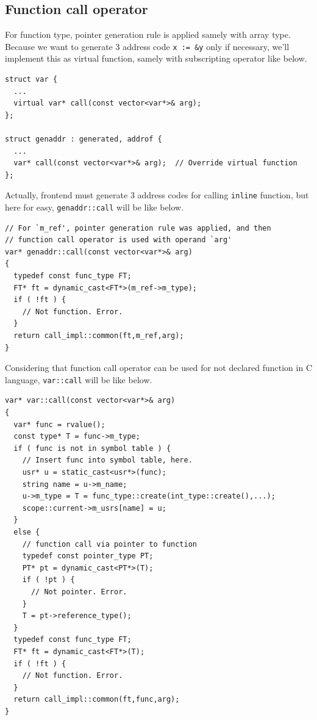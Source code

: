 \subsection{Function call operator}
\label{expr_e006}

For function type, pointer generation rule is applied
samely with array type. Because we want to generate 3 address code
{\tt{x := \&y}} only if necessary,
we'll implement this as virtual function, samely with subscripting
operator like below.
\begin{verbatim}
struct var {
  ...
  virtual var* call(const vector<var*>& arg);
};

struct genaddr : generated, addrof {
  ...
  var* call(const vector<var*>& arg);  // Override virtual function
};
\end{verbatim}
Actually, frontend must generate 3 address codes
for calling {\tt{inline}} function, but here for easy,
{\tt{genaddr::call}} will be like below.  
\begin{verbatim}
// For `m_ref', pointer generation rule was applied, and then
// function call operator is used with operand `arg'
var* genaddr::call(const vector<var*>& arg)
{
  typedef const func_type FT;
  FT* ft = dynamic_cast<FT*>(m_ref->m_type);
  if ( !ft ) {
    // Not function. Error.
  }
  return call_impl::common(ft,m_ref,arg);
}
\end{verbatim}
Considering that function call operator can be used for not
declared function in C language, 
{\tt{var::call}} will be like below.
\begin{verbatim}
var* var::call(const vector<var*>& arg)
{
  var* func = rvalue();
  const type* T = func->m_type;
  if ( func is not in symbol table ) {
    // Insert func into symbol table, here.
    usr* u = static_cast<usr*>(func);
    string name = u->m_name;
    u->m_type = T = func_type::create(int_type::create(),...);
    scope::current->m_usrs[name] = u;
  }
  else {
    // function call via pointer to function
    typedef const pointer_type PT;
    PT* pt = dynamic_cast<PT*>(T);
    if ( !pt ) {
      // Not pointer. Error.
    }
    T = pt->reference_type();
  }
  typedef const func_type FT;
  FT* ft = dynamic_cast<FT*>(T);
  if ( !ft ) {
    // Not function. Error.
  }
  return call_impl::common(ft,func,arg);
}
\end{verbatim}


